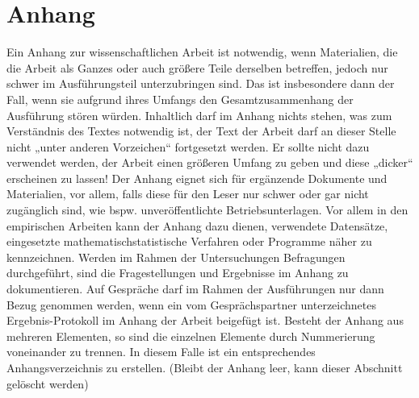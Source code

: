 \documentclass[12pt, oneside]{article}
\begin{document}
\section*{Anhang} \label{Anhang}
%
Ein Anhang zur wissenschaftlichen Arbeit ist notwendig, wenn Materialien, die die Arbeit als Ganzes oder auch größere Teile derselben betreffen, jedoch nur schwer im Ausführungsteil unterzubringen sind. Das ist insbesondere dann der Fall, wenn sie aufgrund ihres Umfangs den Gesamtzusammenhang der Ausführung stören würden. Inhaltlich darf im Anhang nichts stehen, was zum Verständnis des Textes notwendig ist, der Text der Arbeit darf an dieser Stelle nicht „unter anderen Vorzeichen“ fortgesetzt werden. Er sollte nicht dazu verwendet werden, der Arbeit einen größeren Umfang zu geben und diese „dicker“ erscheinen zu lassen!
\vspace{3mm}
\newline
Der Anhang eignet sich für ergänzende Dokumente und Materialien, vor allem, falls diese für den Leser nur schwer oder gar nicht zugänglich sind, wie bspw. unveröffentlichte Betriebsunterlagen.
\vspace{3mm}
\newline
Vor allem in den empirischen Arbeiten kann der Anhang dazu dienen, verwendete Datensätze, eingesetzte mathematischstatistische Verfahren oder Programme näher zu kennzeichnen. Werden im Rahmen der Untersuchungen Befragungen durchgeführt, sind die Fragestellungen und Ergebnisse im Anhang zu dokumentieren. Auf Gespräche darf im Rahmen der Ausführungen nur dann Bezug genommen werden, wenn ein vom Gesprächspartner unterzeichnetes Ergebnis-Protokoll im Anhang der Arbeit beigefügt ist.
\vspace{3mm}
\newline
Besteht der Anhang aus mehreren Elementen, so sind die einzelnen Elemente durch Nummerierung voneinander zu trennen. In diesem Falle ist ein entsprechendes Anhangsverzeichnis zu erstellen.
\vspace{3mm}
\newline
(Bleibt der Anhang leer, kann dieser Abschnitt gelöscht werden)
\newpage


\end{document}
